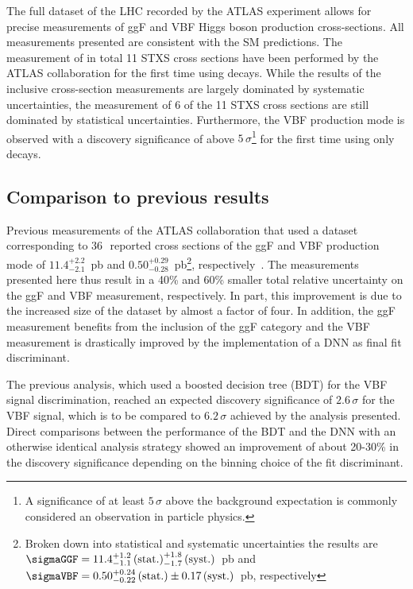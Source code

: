 The full \RunTwo dataset of the LHC recorded by the ATLAS experiment allows for precise measurements of ggF and VBF Higgs boson production cross-sections.
All measurements presented are consistent with the SM predictions. 
The measurement of in total 11 STXS cross sections have been performed by the ATLAS collaboration for the first time using \HWW decays. 
While the results of the inclusive cross-section measurements are largely dominated by systematic uncertainties, the measurement of 6 of the 11 STXS cross sections are still dominated by statistical uncertainties. 
Furthermore, the VBF production mode is observed with a discovery significance of above $5\,\sigma$\footnote{A significance of at least $5\,\sigma$ above the background expectation is commonly considered an observation in particle physics.} for the first time using only \HWW decays.

\subsection{Comparison to previous results}
Previous \RunTwo measurements of the ATLAS collaboration that used a dataset corresponding to 36\,\ifb\ reported cross sections of the ggF and VBF production mode of $11.4^{+2.2}_{-2.1}$~pb and $0.50^{+0.29}_{-0.28}$~pb\footnote{Broken down into statistical and systematic uncertainties the results are $\sigmaGGF = 11.4^{+1.2}_{-1.1}\,\text{(stat.)}^{+1.8}_{-1.7}\,\text{(syst.)}$~pb and $\sigmaVBF= 0.50^{+0.24}_{-0.22}\,\text{(stat.)}\pm 0.17\,\text{(syst.)}$~pb, respectively}, respectively~\cite{HIGG-2016-07}.
The measurements presented here thus result in a 40\% and 60\% smaller total relative uncertainty on the ggF and VBF measurement, respectively. In part, this improvement is due to the increased size of the dataset by almost a factor of four.
In addition, the ggF measurement benefits from the inclusion of the ggF \TwoJet category and the VBF measurement is drastically improved by the implementation of a DNN as final fit discriminant. 

The previous analysis, which used a boosted decision tree (BDT) for the VBF signal discrimination, reached an expected discovery significance of $2.6\,\sigma$ for the VBF signal, which is to be compared to $6.2\,\sigma$ achieved by the analysis presented. 
Direct comparisons between the performance of the BDT and the DNN with an otherwise identical analysis strategy showed an improvement of about 20-30\% in the discovery significance depending on the binning choice of the fit discriminant. %

